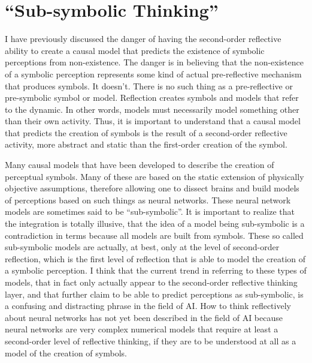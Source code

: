 \section{``Sub-symbolic Thinking''}

I have previously discussed the danger of having the second-order
reflective ability to create a causal model that predicts the
existence of symbolic perceptions from non-existence.  The danger is
in believing that the non-existence of a symbolic perception
represents some kind of actual pre-reflective mechanism that produces
symbols.  It doesn't.  There is no such thing as a pre-reflective or
pre-symbolic symbol or model.  Reflection creates symbols and models
that refer to the dynamic.  In other words, models must necessarily
model something other than their own activity.  Thus, it is important
to understand that a causal model that predicts the creation of
symbols is the result of a second-order reflective activity, more
abstract and static than the first-order creation of the symbol.

Many causal models that have been developed to describe the creation
of perceptual symbols.  Many of these are based on the static
extension of physically objective assumptions, therefore allowing one
to dissect brains and build models of perceptions based on such things
as neural networks.  These neural network models are sometimes said to
be ``sub-symbolic''.  It is important to realize that the integration
is totally illusive, that the idea of a model being sub-symbolic is a
contradiction in terms because all models are built from symbols.
These so called sub-symbolic models are actually, at best, only at the
level of second-order reflection, which is the first level of
reflection that is able to model the creation of a symbolic
perception.  I think that the current trend in referring to these
types of models, that in fact only actually appear to the second-order
reflective thinking layer, and that further claim to be able to
predict perceptions as sub-symbolic, is a confusing and distracting
phrase in the field of AI.  How to think reflectively about neural
networks has not yet been described in the field of AI because neural
networks are very complex numerical models that require at least a
second-order level of reflective thinking, if they are to be
understood at all as a model of the creation of symbols.

